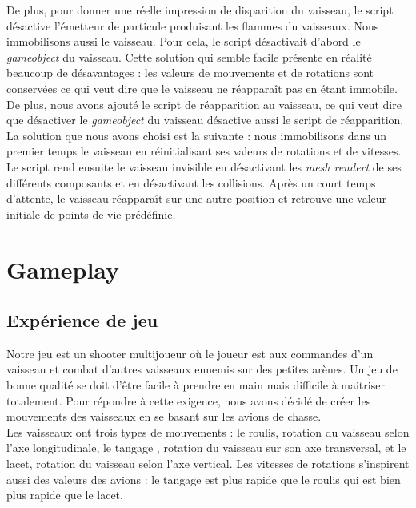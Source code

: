\documentclass[12pt, titlepage]{article}
\begin{document}
\begin{spacing}{1.5}
De plus, pour donner une réelle impression de disparition du vaisseau, le script désactive l'émetteur de particule produisant les flammes du vaisseaux. Nous immobilisons aussi le vaisseau. Pour cela, le script désactivait d'abord le \textit{gameobject} du vaisseau. Cette solution qui semble facile présente en réalité beaucoup de désavantages : les valeurs de mouvements et de rotations sont conservées ce qui veut dire que le vaisseau ne réapparaît pas en étant immobile. De plus, nous avons ajouté le script de réapparition au vaisseau, ce qui veut dire que désactiver le \textit{gameobject} du vaisseau désactive aussi le script de réapparition.\\
 
 La solution que nous avons choisi est la suivante : nous immobilisons dans un premier temps le vaisseau en réinitialisant ses valeurs de rotations et de vitesses. Le script  rend ensuite le vaisseau invisible en désactivant les \textit{mesh rendert} de ses différents composants et en désactivant les collisions. Après un court temps d'attente, le vaisseau réapparaît sur une autre position et retrouve une valeur initiale de points de vie prédéfinie.\\

\newpage
\section{Gameplay}

\subsection{Expérience de jeu}

Notre jeu est un shooter multijoueur où le joueur est aux commandes d'un vaisseau et combat d'autres vaisseaux ennemis sur des petites arènes. Un jeu de bonne qualité se doit d'être facile à prendre en main mais difficile à maitriser totalement. Pour répondre à cette exigence, nous avons décidé de créer les mouvements des vaisseaux en se basant sur les avions de chasse.\\

Les vaisseaux ont trois types de mouvements : le roulis, rotation du vaisseau selon l'axe longitudinale, le tangage , rotation du vaisseau sur son axe transversal, et le lacet, rotation du vaisseau selon l'axe vertical. Les vitesses de rotations s'inspirent aussi des valeurs des avions : le tangage est plus rapide que le roulis qui est bien plus rapide que le lacet. \\


\end{spacing}
\end{document}

